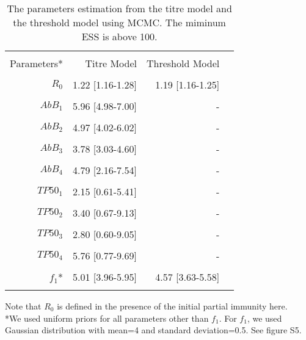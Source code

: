 \documentclass{article}
\begin{document}
\clearpage
\begin{table}[ht]
\begin{minipage}{\textwidth}      
\centering %
\caption{The parameters estimation from the titre model and the threshold model using MCMC. The miminum ESS is above 100.}
\centering %
\begin{tabular}{rrrr}

\hline\hline \\%
Parameters* &          Titre Model &        Threshold Model\\ \\
\hline %
   
    $R_{0}$ &	      1.22 [1.16-1.28] &	1.19 [1.16-1.25]  \\ \\
  
    $AbB_{1}$ &     5.96 [4.98-7.00] &    	- \\ \\

    $AbB_{2}$ &     4.97 [4.02-6.02] &    	- \\ \\

    $AbB_{3}$ &     3.78 [3.03-4.60] &    	- \\ \\

    $AbB_{4}$ &     4.79 [2.16-7.54] &    	- \\ \\
  
    $\mathit{TP50_{1}}$ &    2.15 [0.61-5.41] &  		- \\ \\

    $\mathit{TP50_{2}}$ &    3.40 [0.67-9.13] &  		- \\ \\

	$\mathit{TP50_{3}}$ &    2.80 [0.60-9.05] &  		- \\ \\

    $\mathit{TP50_{4}}$ &    5.76 [0.77-9.69] &  		- \\ \\

    $f_{1}$*          &   	5.01 [3.96-5.95]&         4.57 [3.63-5.58] \\ \\ 
\hline
\end{tabular}
\end{minipage}
\end{table}
Note that $R_{0}$ is defined in the presence of the initial partial immunity here.
\\
*We used uniform priors for all parameters other than $f_{1}$. For $f_{1}$, we used Gaussian distribution with mean=4 and standard deviation=0.5. See figure S5.
\newpage
\end{document}
